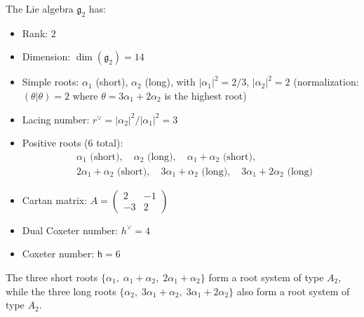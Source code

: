 \begin{computation}\label{comp:G2-roots}
The Lie algebra $\mathfrak{g}_2$ has:
\begin{itemize}
\item Rank: $2$
\item Dimension: $\dim(\mathfrak{g}_2) = 14$
\item Simple roots: $\alpha_1$ (short), $\alpha_2$ (long), with
$|\alpha_1|^2 = 2/3$, $|\alpha_2|^2 = 2$
(normalization: $(\theta|\theta) = 2$ where
$\theta = 3\alpha_1 + 2\alpha_2$ is the highest root)
\item Lacing number: $r^\vee = |\alpha_2|^2/|\alpha_1|^2 = 3$
\item Positive roots ($6$ total):
\begin{align*}
&\alpha_1 \text{ (short)}, \quad
\alpha_2 \text{ (long)}, \quad
\alpha_1 + \alpha_2 \text{ (short)}, \\
&2\alpha_1 + \alpha_2 \text{ (short)}, \quad
3\alpha_1 + \alpha_2 \text{ (long)}, \quad
3\alpha_1 + 2\alpha_2 \text{ (long)}
\end{align*}
\item Cartan matrix:
$A = \begin{pmatrix} 2 & -1 \\ -3 & 2 \end{pmatrix}$
\item Dual Coxeter number: $h^\vee = 4$
\item Coxeter number: $\mathsf{h} = 6$
\end{itemize}
The three short roots $\{\alpha_1,\; \alpha_1+\alpha_2,\;
2\alpha_1+\alpha_2\}$ form a root system of type $A_2$,
while the three long roots
$\{\alpha_2,\; 3\alpha_1+\alpha_2,\; 3\alpha_1+2\alpha_2\}$
also form a root system of type $A_2$.
\end{computation}

